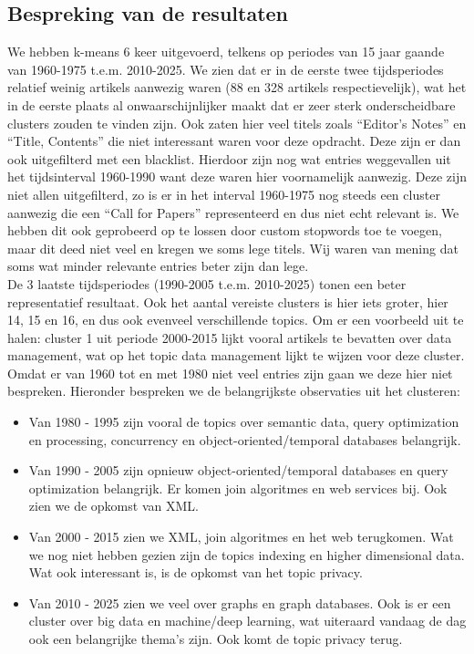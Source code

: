 \documentclass[a4paper,fontsize=11pt]{article}
\begin{document}
\subsection{Bespreking van de resultaten}
 
We hebben k-means 6 keer uitgevoerd, telkens op periodes van 15 jaar gaande van 1960-1975 t.e.m. 2010-2025. We zien dat er in de eerste twee tijdsperiodes relatief weinig artikels aanwezig waren (88 en 328 artikels respectievelijk), wat het in de eerste plaats al onwaarschijnlijker maakt dat er zeer sterk onderscheidbare clusters zouden te vinden zijn.
Ook zaten hier veel titels zoals ``Editor's Notes'' en ``Title, Contents'' die niet interessant waren voor deze opdracht.
Deze zijn er dan ook uitgefilterd met een blacklist. Hierdoor zijn nog wat entries weggevallen uit het tijdsinterval 1960-1990 want deze waren hier voornamelijk aanwezig.
Deze zijn niet allen uitgefilterd, zo is er in het interval 1960-1975 nog steeds een cluster aanwezig die een ``Call for Papers'' representeerd en dus niet echt relevant is.
We hebben dit ook geprobeerd op te lossen door custom stopwords toe te voegen, maar dit deed niet veel en kregen we soms lege titels.
Wij waren van mening dat soms wat minder relevante entries beter zijn dan lege. \\

De 3 laatste tijdsperiodes (1990-2005 t.e.m. 2010-2025) tonen een beter representatief resultaat.
Ook het aantal vereiste clusters is hier iets groter, hier 14, 15 en 16, en dus ook evenveel verschillende topics. Om er een voorbeeld uit te halen: cluster 1 uit periode 2000-2015 lijkt vooral artikels te bevatten over data management, wat op het topic data management lijkt te wijzen voor deze cluster. \\

Omdat er van 1960 tot en met 1980 niet veel entries zijn gaan we deze hier niet bespreken. Hieronder bespreken we de belangrijkste observaties uit het clusteren:

\begin{itemize}
\item Van 1980 - 1995 zijn vooral de topics over semantic data, query optimization en processing, concurrency en object-oriented/temporal databases belangrijk.
\item Van 1990 - 2005 zijn opnieuw object-oriented/temporal databases en query optimization belangrijk. Er komen join algoritmes en web services bij. Ook zien we de opkomst van XML.
\item Van 2000 - 2015 zien we XML, join algoritmes en het web terugkomen. Wat we nog niet hebben gezien zijn de topics indexing en higher dimensional data. Wat ook interessant is, is de opkomst van het topic privacy.
\item Van 2010 - 2025 zien we veel over graphs en graph databases. Ook is er een cluster over big data en machine/deep learning, wat uiteraard vandaag de dag ook een belangrijke thema's zijn. Ook komt de topic privacy terug.
\end{itemize}
\end{document}

